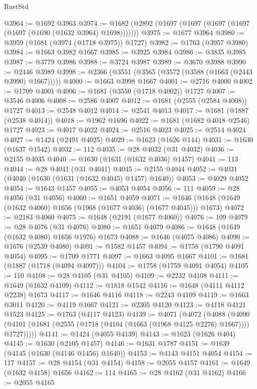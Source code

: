 \begin{lexlean}{RustStd}
\begin{coremodule}
{\begin{coremodule}
{{{{{{{{{{{{{{{{{{{{{{{{{{{{{{{{{{{{{{{{{{{{@3964 := @1692 @3963
@3974 := @1682 (@2892 (@1697 (@1697 (@1697 (@1697 (@1697 (@1690 (@1632 @3964) @1698)))))))
@3975 := @1677 @3964
@3980 := @3959 (@1681 (@3974 (@1718 @3975)) @1727)
@3982 := @1763 (@3957 @3980)
@3984 := @1663 @3982 @1667
@3985 := @3925 @3984
@3986 := @3835 @3985
@3987 := @3779 @3986
@3988 := @3724 @3987
@3989 := @3670 @3988
@3990 := @2446 @3989
@3998 := @2366 (@3551 (@3565 (@3572 (@3588 (@1663 (@2443 @3990) @1667)))))
@4000 := @1663 @3998 @1667
@4001 := @2716 @4000
@4002 := @1709 @4001
@4006 := @1681 (@3550 (@1718 @4002)) @1727
@4007 := @3546 @4006
@4008 := @2586 @4007
@4012 := @1681 (@2555 (@2584 @4008)) @1727
@4013 := @2548 @4012
@4014 := @2541 @4013
@4017 := @1681 (@1887 (@2538 @4014))
@4018 := @1962 @1696
@4022 := @1681 (@1682 @4018 @2546) @1727
@4023 := @4017 @4022
@4024 := @2516 @4023
@4025 := @2514 @4024
@4027 := @1424 (@2491 @4025)
@4029 := @1623 (@1626 @144)
@4031 := @1630 (@1637 @1542)
@4032 := 112
@4035 := @28 @4032 (@31 @4032)
@4036 := @2155 @4035
@4040 := @1630 (@1631 (@1632 @4036) @1457)
@4041 := 113
@4044 := @28 @4041 (@31 @4041)
@4045 := @2155 @4044
@4052 := @4031 (@4040 (@1630 (@1631 (@1632 @4045) @1457) @1640))
@4053 := @4029 @4052
@4054 := @1643 @1457
@4055 := @4053 @4054
@4056 := 111
@4059 := @28 @4056 (@31 @4056)
@4060 := @1651 @4059
@4071 := @1646 (@1648 (@1649 (@1632 @4060) @1656 (@1968 (@1677 @4036) (@1677 @4045))) @1673)
@4072 := @2183 @4060
@4075 := @1648 (@2191 (@1677 @4060))
@4076 := 109
@4079 := @28 @4076 (@31 @4076)
@4080 := @1651 @4079
@4086 := @1648 (@1649 (@1632 @4080) @1656 @1976) @1673
@4088 := @1646 (@4075 @4086)
@4090 := @1676 (@2539 @4080)
@4091 := @1582 @1457
@4094 := @1758 (@1790 @4091 @4054)
@4095 := @1709 @1771
@4097 := @1663 @4095 @1667
@4101 := @1681 (@1887 (@1718 (@4094 @4097)))
@4104 := @1758 (@1759 @4091 @4054)
@4105 := 110
@4108 := @28 @4105 (@31 @4105)
@4109 := @2232 @4108
@4111 := @1649 (@1632 @4109)
@4112 := @1818 @1542
@4116 := @1648 (@4111 @4112 @2238) @1673
@4117 := @1646 @4116
@4118 := @2243 @4109
@4119 := @1663 @3011
@4120 := @4119 @1667
@4121 := @2305 @4120
@4123 := @4118 @4121 @1523
@4125 := @1763 (@4117 @4123)
@4139 := @4071
    (@4072
      (@4088
        (@4090 (@4101 (@1681 (@2555 (@1718 (@4104 (@1663 (@1968 @4125 @2276) @1667)))) @1727)))))
@4141 := @1424 (@4055 @4139)
@4143 := @1623 (@1626 @404)
@4145 := @1630 (@2105 @1457)
@4146 := @1631 @1787
@4151 := @1639 (@4145 (@1630 (@4146 @1456) @1640))
@4153 := @4143 @4151 @4054
@4154 := 117
@4157 := @28 @4154 (@31 @4154)
@4158 := @2055 @4157
@4161 := @1649 (@1632 @4158) @1656
@4162 := 114
@4165 := @28 @4162 (@31 @4162)
@4166 := @2055 @4165
}}}}}}}}}}}}}}}}}}}}}}}}}}}}}}}}}}}}}}}}}}}}
\end{coremodule}}
\end{coremodule}
\end{lexlean}
